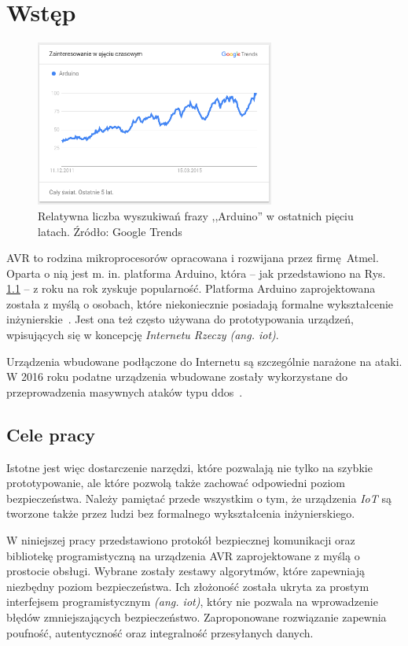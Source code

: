 \chapter{Wstęp}
\label{cha:wstep}

\begin{figure}[h]
\centering
\includegraphics[width=0.7\textwidth]{images/arduino-trends.png}
\caption{Relatywna liczba wyszukiwań frazy ,,Arduino'' w ostatnich pięciu latach. Źródło: Google Trends}
\label{fig:arduinotrends}
\end{figure}

AVR to rodzina mikroprocesorów opracowana i rozwijana przez firmę Atmel. Oparta o nią jest m. in. platforma Arduino, która -- jak przedstawiono na Rys. \ref{fig:arduinotrends} -- z roku na rok zyskuje popularność. Platforma Arduino zaprojektowana została z myślą o osobach, które niekoniecznie posiadają formalne wykształcenie inżynierskie~\cite{BanShi14}. Jest ona też często używana do prototypowania urządzeń, wpisujących się w koncepcję \emph{Internetu Rzeczy (ang. \gls{iot})}.

Urządzenia wbudowane podłączone do Internetu są szczególnie narażone na ataki. W 2016 roku podatne urządzenia wbudowane zostały wykorzystane do przeprowadzenia masywnych ataków typu \gls{ddos}~\cite{AkaIOT}.

\section{Cele pracy}

Istotne jest więc dostarczenie narzędzi, które pozwalają nie tylko na szybkie prototypowanie, ale które pozwolą także zachować odpowiedni poziom bezpieczeństwa. Należy pamiętać przede wszystkim o tym, że urządzenia \emph{IoT} są tworzone także przez ludzi bez formalnego wykształcenia inżynierskiego.

W niniejszej pracy przedstawiono protokół bezpiecznej komunikacji oraz bibliotekę programistyczną na urządzenia AVR zaprojektowane z myślą o prostocie obsługi. Wybrane zostały zestawy algorytmów, które zapewniają niezbędny poziom bezpieczeństwa. Ich złożoność została ukryta za prostym interfejsem programistycznym \emph{(ang. \acrshort{iot})}, który nie pozwala na wprowadzenie błędów zmniejszających bezpieczeństwo.  Zaproponowane rozwiązanie zapewnia poufność, autentyczność oraz integralność przesyłanych danych.

